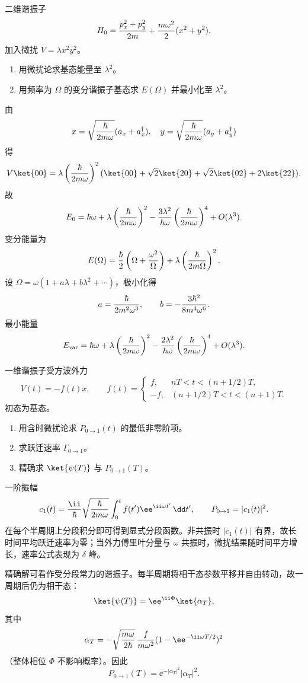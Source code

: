 
\begin{question}
二维谐振子
\[
  H_0={p_x^2+p_y^2\over2m}+{m\omega^2\over2}(x^2+y^2),
\]
加入微扰 $V=\lambda x^2y^2$。
\begin{enumerate}
  \item 用微扰论求基态能量至 $\lambda^2$。
  \item 用频率为 $\Omega$ 的变分谐振子基态求 $E(\Omega)$ 并最小化至 $\lambda^2$。
\end{enumerate}
\begin{solution}
由
\[
  x=\sqrt{\hbar\over2m\omega}(a_x+a_x^\dagger),\quad
  y=\sqrt{\hbar\over2m\omega}(a_y+a_y^\dagger)
\]
得
\[
  V\ket{00}=\lambda\left({\hbar\over2m\omega}\right)^2
  (\ket{00}+\sqrt2\ket{20}+\sqrt2\ket{02}+2\ket{22}).
\]
故
\[
  E_0=\hbar\omega+\lambda\left({\hbar\over2m\omega}\right)^2
  -{3\lambda^2\over\hbar\omega}\left({\hbar\over2m\omega}\right)^4+O(\lambda^3).
\]
变分能量为
\[
  E(\Omega)={\hbar\over2}\left(\Omega+{\omega^2\over\Omega}\right)
  +\lambda\left({\hbar\over2m\Omega}\right)^2 .
\]
设 $\Omega=\omega(1+a\lambda+b\lambda^2+\cdots)$，极小化得
\[
  a={\hbar\over2m^2\omega^3},\qquad b=-{3\hbar^2\over8m^4\omega^6}.
\]
最小能量
\[
  E_{\rm var}=\hbar\omega+\lambda\left({\hbar\over2m\omega}\right)^2
  -{2\lambda^2\over\hbar\omega}\left({\hbar\over2m\omega}\right)^4+O(\lambda^3).
\]
\end{solution}
\end{question}

\begin{question}
一维谐振子受方波外力
\[
  V(t)=-f(t)x,\qquad
  f(t)=\begin{cases}
  f,&nT<t<(n+1/2)T,\\
  -f,&(n+1/2)T<t<(n+1)T.
  \end{cases}
\]
初态为基态。
\begin{enumerate}
  \item 用含时微扰论求 $P_{0\to1}(t)$ 的最低非零阶项。
  \item 求跃迁速率 $\Gamma_{0\to1}$。
  \item 精确求 $\ket{\psi(T)}$ 与 $P_{0\to1}(T)$。
\end{enumerate}
\begin{solution}
一阶振幅
\[
  c_1(t)={\ii\over\hbar}\sqrt{\hbar\over2m\omega}
  \int_0^t f(t')\ee^{\ii\omega t'}\,\dd t',
\qquad P_{0\to1}=|c_1(t)|^2 .
\]
在每个半周期上分段积分即可得到显式分段函数。非共振时 $|c_1(t)|$ 有界，故长时间平均跃迁速率为零；当外力傅里叶分量与 $\omega$ 共振时，微扰结果随时间平方增长，速率公式表现为 $\delta$ 峰。

精确解可看作受分段常力的谐振子。每半周期将相干态参数平移并自由转动，故一周期后仍为相干态：
\[
  \ket{\psi(T)}=\ee^{\ii\Phi}\ket{\alpha_T},
\]
其中
\[
  \alpha_T=-\sqrt{m\omega\over2\hbar}\,{f\over m\omega^2}
  (1-\ee^{-\ii\omega T/2})^2
\]
（整体相位 $\Phi$ 不影响概率）。因此
\[
  P_{0\to1}(T)=\ee^{-|\alpha_T|^2}|\alpha_T|^2 .
\]
\end{solution}
\end{question}

